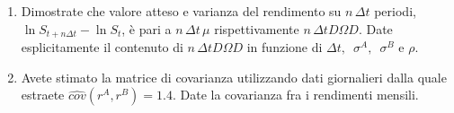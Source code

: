 \documentclass[a4paper,12pt]{article}
\begin{document}
\begin{enumerate}
\begin{enumerate}
\item Dimostrate che valore atteso e varianza del rendimento su $n\,\Delta t$
periodi, $\ln S_{t+n\Delta t}-\ln S_{t}$, \`{e} pari a $n\,\Delta t\,\mu $
rispettivamente $n\,\Delta tD\Omega D$. Date esplicitamente il contenuto di $%
n\,\Delta tD\Omega D$ in funzione di $\Delta t,$\ $\sigma ^{A},$\ $\sigma
^{B}$ e $\rho $.

\item Avete stimato la matrice di covarianza utilizzando dati giornalieri
dalla quale estraete $\widehat{cov}(r^{A},r^{B})=1.4$. Date la covarianza
fra i rendimenti mensili.
\end{enumerate}
\end{enumerate}
\end{document}
